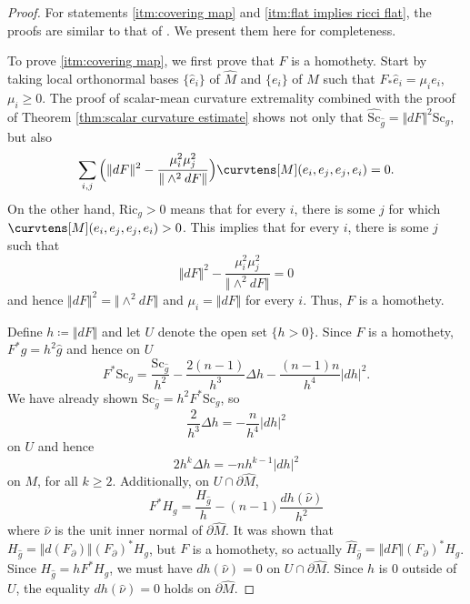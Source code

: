 \documentclass[12pt, reqno]{amsart}
\theoremstyle{plain} %
\theoremstyle{definition}
\theoremstyle{remark}
\numberwithin{equation}{section}
\newcommand{\dom}[1]{\hat{#1}}
\newcommand{\onorm}[1]{\Vert #1 \Vert}
\newcommand{\pnorm}[1]{| #1 |}
\newcommand{\bnd}[1]{\partial #1}
\newcommand{\Sc}{\mathrm{Sc}}
\newcommand{\Ric}{\mathrm{Ric}}
\begin{document}
\begin{proof}
    For statements \ref{itm:covering map} and \ref{itm:flat implies ricci flat}, the proofs are similar to that of \cite[p.~98]{Wang:2023}.
    We present them here for completeness.

    To prove \ref{itm:covering map}, we first prove that \(F\) is a homothety.
    Start by taking local orthonormal bases \(\{\dom{e}_i\}\) of \(\dom{M}\) and \(\{e_i\}\) of \(M\) such that \(F_* \dom{e}_i = \mu_i e_i\), \(\mu_i \geq 0\).
    The proof of scalar-mean curvature extremality combined with the proof of Theorem \ref{thm:scalar curvature estimate} shows not only that \(\dom{\Sc}_{\dom{g}} = \onorm{dF}^2\Sc_g\), but also
    \begin{equation*}
        \sum_{i,j} \Big(\onorm{dF}^2 - \frac{\mu_i^2\mu_j^2}{\onorm{\wedge^2 dF}}\Big)\curvtens[M](e_i,e_j,e_j,e_i) = 0.
    \end{equation*}
    On the other hand, \(\Ric_g > 0\) means that for every \(i\), there is some \(j\) for which \(\curvtens[M](e_i,e_j,e_j,e_i) > 0\).
    This implies that for every \(i\), there is some \(j\) such that
    \begin{equation*}
        \onorm{dF}^2 - \frac{\mu_i^2\mu_j^2}{\onorm{\wedge^2 dF}} = 0
    \end{equation*}
    and hence \(\onorm{dF}^2 = \onorm{\wedge^2 dF}\) and \(\mu_i = \onorm{dF}\) for every \(i\).
    Thus, \(F\) is a homothety.

    Define \(h \coloneqq \onorm{dF}\) and let \(U\) denote the open set \(\{h > 0\}\).
    Since \(F\) is a homothety, \(F^*g = h^2\dom{g}\) and hence on \(U\)
    \begin{equation*}
        F^*\Sc_g = \frac{\Sc_{\dom{g}}}{h^2} - \frac{2(n-1)}{h^3}\Delta h - \frac{(n-1)n}{h^4}\pnorm{dh}^2.
    \end{equation*}
    We have already shown \(\Sc_{\dom{g}} = h^2 F^*\Sc_g\), so
    \begin{equation*}
        \frac{2}{h^3}\Delta h = -\frac{n}{h^4}\pnorm{dh}^2
    \end{equation*}
    on \(U\) and hence
    \begin{equation*}
        2h^k\Delta h = -nh^{k-1}\pnorm{dh}^2
    \end{equation*}
    on \(M\), for all \(k \geq 2\).
    Additionally, on \(U \cap \bnd{\dom{M}}\),
    \begin{equation*}
        F^*H_g = \frac{H_{\dom{g}}}{h} - (n-1) \frac{dh(\dom{\nu})}{h^2}
    \end{equation*}
    where \(\dom{\nu}\) is the unit inner normal of \(\bnd{\dom{M}}\).
    It was shown that \(H_{\dom{g}} = \onorm{d(F_\partial)} (F_\partial)^*H_g\), but \(F\) is a homothety, so actually \(\dom{H}_{\dom{g}} = \onorm{dF} (F_\partial)^*H_g\).
    Since \(H_{\dom{g}} = hF^*H_g\), we must have \(dh(\dom{\nu}) = 0\) on \(U \cap \bnd{\dom{M}}\).
    Since \(h\) is \(0\) outside of \(U\), the equality \(dh(\dom{\nu}) = 0\) holds on \(\bnd{\dom{M}}\).


\end{proof}
\end{document}
